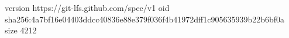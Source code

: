 version https://git-lfs.github.com/spec/v1
oid sha256:4a7bf16e04403ddcc40836e88e379f036f4b41972dff1c905635939b22b6bf0a
size 4212

